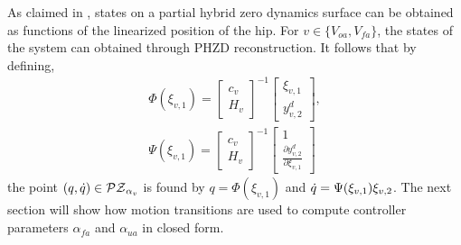 \label{sec:reconstruction} As claimed in \cite{ACP:HSCC12}, states on a partial hybrid zero dynamics surface can be obtained as functions of the linearized position of the hip. For $v \in \{V_{oa},V_{fa}\}$, the states of the system can obtained through PHZD reconstruction. It follows that by defining,
\begin{align}
\Phi(\xi_{v,1}) = 
\begin{bmatrix}
c_{v} \\
H_{v}
\end{bmatrix}^{-1}
\begin{bmatrix}
\xi_{v,1} \\
y^{d}_{v,2}
\end{bmatrix}
, \\
\Psi(\xi_{v,1}) = 
\begin{bmatrix}
c_{v} \\
H_{v}
\end{bmatrix}^{-1}
\begin{bmatrix}
1 \\
\frac{\partial y^{d}_{v,2}}{\partial \xi_{v,1}}
\end{bmatrix} \nonumber
\end{align}
the point $(q, \dot {q}) \in \mathcal{PZ}_{\alpha_{v}}$ is found by $q  = \Phi(\xi_{v,1})$ and $\dot {q}  = \Psi(\xi_{v,1})\xi_{v,2}$. The next section will show how motion transitions are used to compute controller parameters $\alpha_{fa}$ and $\alpha_{ua}$ in closed form.


